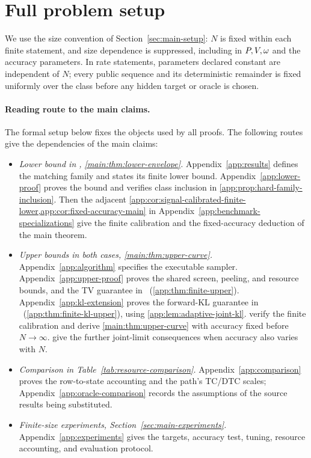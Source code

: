 \section{Full problem setup}
\label{app:setup}

We use the size convention of Section~\ref{sec:main-setup}: $N$ is fixed
within each finite statement, and size dependence is suppressed, including
in $P,V,\omega$ and the accuracy parameters.
In rate statements, parameters declared constant are independent of $N$;
every public sequence and its deterministic remainder is fixed uniformly
over the class before any hidden target or oracle is chosen.

\paragraph{Reading route to the main claims.}
The formal setup below fixes the objects used by all proofs.
The following routes give the dependencies of the main claims:
\begin{itemize}
 \item \emph{Lower bound in \HellingerCase, \cref{main:thm:lower-envelope}.}
 Appendix~\ref{app:results} defines the matching family and states its
 finite lower bound.  Appendix~\ref{app:lower-proof} proves the bound and
 verifies class inclusion in \cref{app:prop:hard-family-inclusion}.
 Then the adjacent
 \cref{app:cor:signal-calibrated-finite-lower,app:cor:fixed-accuracy-main}
 in Appendix~\ref{app:benchmark-specializations} give the finite
 calibration and the fixed-accuracy deduction of the main theorem.
 \item \emph{Upper bounds in both cases, \cref{main:thm:upper-curve}.}
 Appendix~\ref{app:algorithm} specifies the executable sampler.
 Appendix~\ref{app:upper-proof} proves the shared screen, peeling, and
 resource bounds, and the TV guarantee in \HellingerCase\
 (\cref{app:thm:finite-upper}).
 Appendix~\ref{app:kl-extension} proves the forward-KL guarantee in
 \KLCase\ (\cref{app:thm:finite-kl-upper}), using
 \cref{app:lem:adaptive-joint-kl}.
 verify the finite calibration and derive \cref{main:thm:upper-curve}
 with accuracy fixed before $N\to\infty$.
 \ifincludeexponents
  give the further
 joint-limit consequences when accuracy also varies with $N$.
 \fi
 \item \emph{Comparison in Table~\ref{tab:resource-comparison}.}
 Appendix~\ref{app:comparison} proves the row-to-state accounting and
 the path's TC/DTC scales; Appendix~\ref{app:oracle-comparison} records
 the assumptions of the source results being substituted.
 \item \emph{Finite-size experiments, Section~\ref{sec:main-experiments}.}
 Appendix~\ref{app:experiments} gives the targets, accuracy test, tuning,
 resource accounting, and evaluation protocol.
\end{itemize}
